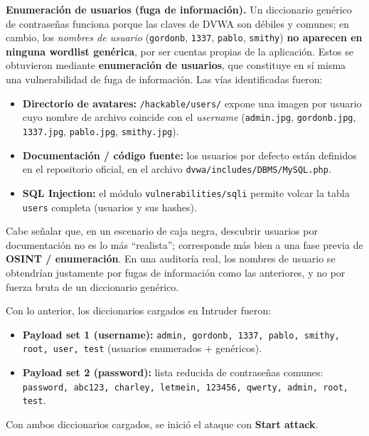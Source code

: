 \documentclass[letter,12pt]{article}
\begin{document}
\textbf{Enumeración de usuarios (fuga de información).} Un diccionario genérico de contraseñas funciona porque las claves de DVWA son débiles y comunes; en cambio, los \emph{nombres de usuario} (\texttt{gordonb}, \texttt{1337}, \texttt{pablo}, \texttt{smithy}) \textbf{no aparecen en ninguna wordlist genérica}, por ser cuentas propias de la aplicación. Estos se obtuvieron mediante \textbf{enumeración de usuarios}, que constituye en sí misma una vulnerabilidad de fuga de información. Las vías identificadas fueron:
\begin{itemize}
    \item \textbf{Directorio de avatares:} \texttt{/hackable/users/} expone una imagen por usuario cuyo nombre de archivo coincide con el \emph{username} (\texttt{admin.jpg}, \texttt{gordonb.jpg}, \texttt{1337.jpg}, \texttt{pablo.jpg}, \texttt{smithy.jpg}).
    \item \textbf{Documentación / código fuente:} los usuarios por defecto están definidos en el repositorio oficial, en el archivo \texttt{dvwa/includes/DBMS/MySQL.php}.
    \item \textbf{SQL Injection:} el módulo \texttt{vulnerabilities/sqli} permite volcar la tabla \texttt{users} completa (usuarios y sus hashes).
\end{itemize}
Cabe señalar que, en un escenario de caja negra, descubrir usuarios por documentación no es lo más ``realista''; corresponde más bien a una fase previa de \textbf{OSINT / enumeración}. En una auditoría real, los nombres de usuario se obtendrían justamente por fugas de información como las anteriores, y no por fuerza bruta de un diccionario genérico.

Con lo anterior, los diccionarios cargados en Intruder fueron:
\begin{itemize}
    \item \textbf{Payload set 1 (username):} \texttt{admin, gordonb, 1337, pablo, smithy, root, user, test} (usuarios enumerados + genéricos).
    \item \textbf{Payload set 2 (password):} lista reducida de contraseñas comunes: \texttt{password, abc123, charley, letmein, 123456, qwerty, admin, root, test}.
\end{itemize}
Con ambos diccionarios cargados, se inició el ataque con \textbf{Start attack}.
\end{document}
